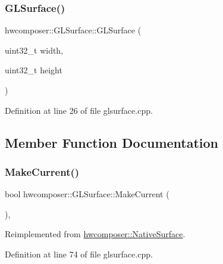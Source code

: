 \subsubsection{\texorpdfstring{G\+L\+Surface()}{GLSurface()}\hspace{0.1cm}{\footnotesize\ttfamily [2/2]}}
{\footnotesize\ttfamily hwcomposer\+::\+G\+L\+Surface\+::\+G\+L\+Surface (\begin{DoxyParamCaption}\item[{uint32\+\_\+t}]{width,  }\item[{uint32\+\_\+t}]{height }\end{DoxyParamCaption})}



Definition at line 26 of file glsurface.\+cpp.


\begin{DoxyCode}{0}
\end{DoxyCode}


\subsection{Member Function Documentation}
\mbox{\label{classhwcomposer_1_1GLSurface_a5d2720365cbfe670344bc74831a7895a}} 
\subsubsection{\texorpdfstring{Make\+Current()}{MakeCurrent()}}
{\footnotesize\ttfamily bool hwcomposer\+::\+G\+L\+Surface\+::\+Make\+Current (\begin{DoxyParamCaption}{ }\end{DoxyParamCaption})\hspace{0.3cm}{\ttfamily [override]}, {\ttfamily [virtual]}}



Reimplemented from \mbox{\hyperlink{classhwcomposer_1_1NativeSurface_a2e3bdea36f4b2d3f655a5f6d38670d51}{hwcomposer\+::\+Native\+Surface}}.



Definition at line 74 of file glsurface.\+cpp.


